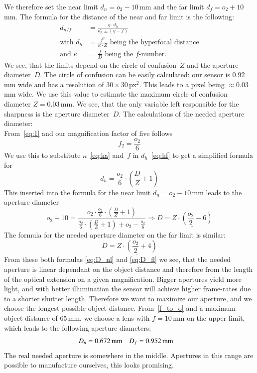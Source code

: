 \documentclass[12pt,a4paper]{article}
\begin{document}
We therefore set the near limit $d_n = o_2 - 10$\,mm and the far limit $d_f = o_2 + 10$\,mm.
The formula for the distance of the near and far limit is the following: %
\begin{align}
\label{eq:nf}
d_{n/f} &= \frac{g \cdot d_h}{d_h \pm (g-f)} \\
\label{eq:hf}\text{with } d_h &= \frac{f^2}{\kappa \cdot Z} \text{ being the hyperfocal distance}\\
\label{eq:ka}\text{and } \kappa &= \frac{f}{D} \text{ being the $f$-number.}
\end{align}
We see, that the limits depend on the circle of confusion~$Z$ and the aperture diameter~$D$.
The circle of confusion can be easily calculated: our sensor is 0.92\,mm wide and has a resolution of $30 \times 30$\,px$^2$.
This leads to a pixel being $\approx 0.03$\,mm wide.
We use this value to estimate the maximum circle of confusion diameter $Z = 0.03$\,mm.
We see, that the only variable left responsible for the sharpness is the aperture diameter~$D$.
The calculations of the needed aperture diameter:\\
From~\autoref{eq:1} and our magnification factor of five follows
\begin{equation}
\label{f_to_o}
f_2 = \frac{o_2}{6}
\end{equation}
We use this to substitute $\kappa$~\eqref{eq:ka} and~$f$ in $d_h$~\eqref{eq:hf} to get a simplified formula for
\begin{equation}
d_h = \frac{o_2}{6} \cdot \left( {\frac{D}{Z} + 1 } \right)
\end{equation}
This inserted into the formula for the near limit $d_n = o_2 - 10$\,mm leads to the aperture diameter
\begin{equation}
\label{eq:D_nl}
o_2 - 10 = \frac{o_2 \cdot \frac{o_2}{6} \cdot \left( { \frac{D}{Z} + 1} \right) }{ \frac{o_2}{6} \cdot \left( { \frac{D}{Z} + 1} \right) + o_2  - \frac{o_2}{6} } \Rightarrow D = \underline{Z \cdot \left( { \frac{o_2}{2} -6} \right)}
\end{equation}
The formula for the needed aperture diameter on the far limit is similar:
\begin{equation}
\label{eq:D_fl}
D = \underline{Z \cdot \left(\frac{o_2}{2} +4 \right)}
\end{equation}
From these both formulas \eqref{eq:D_nl} and \eqref{eq:D_fl} we see, that the needed aperture is linear dependant on the object distance and therefore from the length of the optical extension on a given magnification.
Bigger apertures yield more light, and with better illumination the sensor will achieve higher frame-rates due to a shorter shutter length.
Therefore we want to maximize our aperture, and we choose the longest possible object distance.
From~\eqref{f_to_o} and a maximum object distance of 65\,mm, we choose a lens with $f=10$\,mm on the upper limit, which leads to the following aperture diameters:
\begin{align*}
D_n &= \unit[0.672]{mm} & D_f &= \unit[0.952]{mm}
\end{align*}
The real needed aperture is somewhere in the middle.
Apertures in this range are possible to manufacture ourselves, this looks promising.
\end{document}
